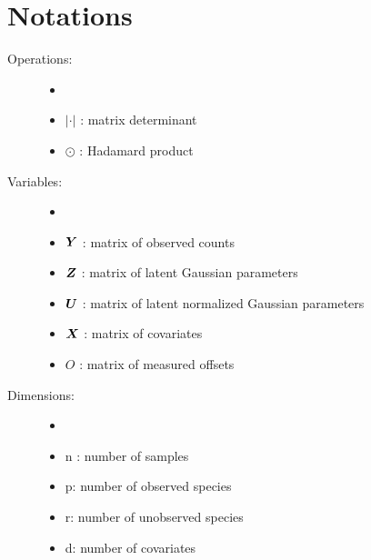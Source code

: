  \section*{Notations}
 
 \begin{description}
 \item[Operations:]  \begin{itemize}
     \item[]
 \item[] $|\cdot|$ : matrix determinant
 \item[] $\odot$ : Hadamard product
 \end{itemize}
 \item[Variables:] \begin{itemize}
     \item[]
 \item[] ${\boldsymbol{Y}}$ :  matrix  of observed counts
 \item[] ${\boldsymbol{Z}}$ : matrix of latent Gaussian parameters 
 \item[] ${\boldsymbol{U}}$ : matrix of latent normalized Gaussian parameters 
 \item[] ${\boldsymbol{X}}$ : matrix of covariates 
 \item[] $O$ : matrix of measured offsets
 \end{itemize}
 \item[Dimensions:]\begin{itemize}
     \item[]
 \item[] n : number of samples
 \item[] p: number of observed species
 \item[] r: number of unobserved species
 \item[] d: number of covariates
 \end{itemize}
 \end{description} 